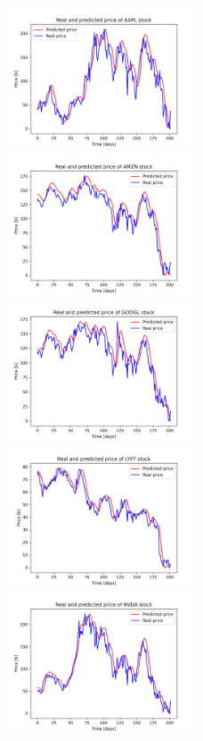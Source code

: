 \begin{figure}
\includegraphics[width=0.5\textwidth]{./graf/model4/AAPL.png}
\includegraphics[width=0.5\textwidth]{./graf/model4/AMZN.png}
\includegraphics[width=0.5\textwidth]{./graf/model4/GOOGL.png}
\includegraphics[width=0.5\textwidth]{./graf/model4/LYFT.png}
\includegraphics[width=0.5\textwidth]{./graf/model4/NVDA.png}

\end{figure}
